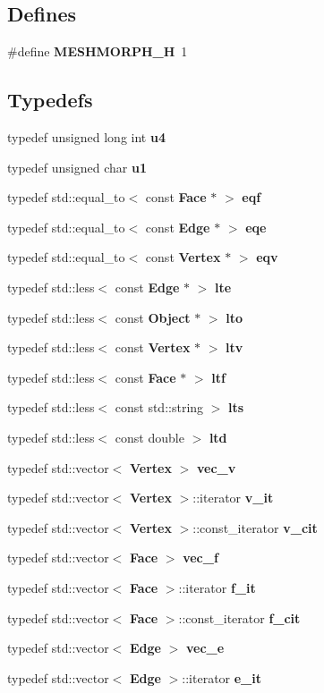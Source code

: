 \subsection*{Defines}
\begin{CompactItemize}
\item 
\#define {\bf MESHMORPH\_\-H}~1
\end{CompactItemize}
\subsection*{Typedefs}
\begin{CompactItemize}
\item 
typedef unsigned long int {\bf u4}
\item 
typedef unsigned char {\bf u1}
\item 
typedef std::equal\_\-to$<$ const {\bf Face} $\ast$ $>$ {\bf eqf}
\item 
typedef std::equal\_\-to$<$ const {\bf Edge} $\ast$ $>$ {\bf eqe}
\item 
typedef std::equal\_\-to$<$ const {\bf Vertex} $\ast$ $>$ {\bf eqv}
\item 
typedef std::less$<$ const {\bf Edge} $\ast$ $>$ {\bf lte}
\item 
typedef std::less$<$ const {\bf Object} $\ast$ $>$ {\bf lto}
\item 
typedef std::less$<$ const {\bf Vertex} $\ast$ $>$ {\bf ltv}
\item 
typedef std::less$<$ const {\bf Face} $\ast$ $>$ {\bf ltf}
\item 
typedef std::less$<$ const std::string $>$ {\bf lts}
\item 
typedef std::less$<$ const double $>$ {\bf ltd}
\item 
typedef std::vector$<$ {\bf Vertex} $>$ {\bf vec\_\-v}
\item 
typedef std::vector$<$ {\bf Vertex} $>$::iterator {\bf v\_\-it}
\item 
typedef std::vector$<$ {\bf Vertex} $>$::const\_\-iterator {\bf v\_\-cit}
\item 
typedef std::vector$<$ {\bf Face} $>$ {\bf vec\_\-f}
\item 
typedef std::vector$<$ {\bf Face} $>$::iterator {\bf f\_\-it}
\item 
typedef std::vector$<$ {\bf Face} $>$::const\_\-iterator {\bf f\_\-cit}
\item 
typedef std::vector$<$ {\bf Edge} $>$ {\bf vec\_\-e}
\item 
typedef std::vector$<$ {\bf Edge} $>$::iterator {\bf e\_\-it}

\end{CompactItemize}
